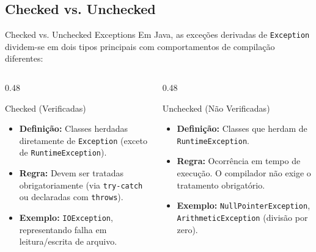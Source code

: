 \documentclass[9pt]{beamer}
\begin{document}
\subsection{Checked vs. Unchecked}
\begin{frame}{Checked vs. Unchecked Exceptions}
    Em Java, as exceções derivadas de \texttt{Exception} dividem-se em dois tipos principais com comportamentos de compilação diferentes:
    
    \vspace{0.3cm}
    
    \begin{columns}[t]
        \begin{column}{0.48\textwidth}
            \begin{block}{Checked (Verificadas)}
                \small
                \begin{itemize}
                    \item \textbf{Definição:} Classes herdadas diretamente de \texttt{Exception} (exceto de \texttt{RuntimeException}).
                    \item \textbf{Regra:} Devem ser tratadas obrigatoriamente (via \texttt{try-catch} ou declaradas com \texttt{throws}).
                    \item \textbf{Exemplo:} \texttt{IOException}, representando falha em leitura/escrita de arquivo.
                \end{itemize}
            \end{block}
        \end{column}
        
        \begin{column}{0.48\textwidth}
            \begin{block}{Unchecked (Não Verificadas)}
                \small
                \begin{itemize}
                    \item \textbf{Definição:} Classes que herdam de \texttt{RuntimeException}.
                    \item \textbf{Regra:} Ocorrência em tempo de execução. O compilador não exige o tratamento obrigatório.
                    \item \textbf{Exemplo:} \texttt{NullPointerException}, \texttt{ArithmeticException} (divisão por zero).
                \end{itemize}
            \end{block}
        \end{column}
    \end{columns}
\end{frame}
\end{document}
